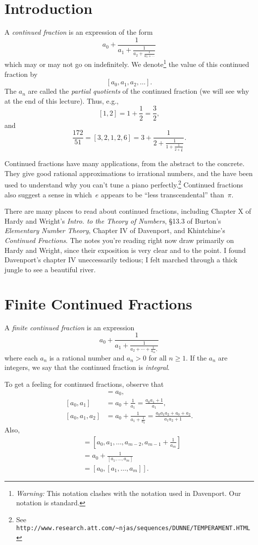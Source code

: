 \documentclass[11pt]{report}
\begin{document}
\section{Introduction}
A {\em continued fraction} is an expression of the form
$$a_0 + \frac{1}{a_1+\frac{1}{a_2+\frac{1}{a_3+\cdots}}}$$
which may or may not go on indefinitely.  We denote\footnote{{\em Warning:}
  This notation clashes with the notation
  used in Davenport.  Our notation is standard.}
the value of this continued fraction by
$$[a_0,a_1,a_2,\ldots].$$
The $a_n$ are called the {\em partial quotients}
of the continued fraction (we will see why at the end of this lecture).
Thus, e.g.,
$$[1,2] = 1+\frac{1}{2} = \frac{3}{2},$$
and
$$\frac{172}{51} = [3,2,1,2,6]=3+\frac{1}{2+\frac{1}{1+\frac{1}{2+\frac{1}{6}}}}.$$

Continued fractions have many applications, from the abstract to the concrete.
They give good rational approximations to irrational numbers, and
the have been used to understand why you can't tune a
piano perfectly.\footnote{See
{\tt http://www.research.att.com/\~{\mbox{}}njas/sequences/DUNNE/TEMPERAMENT.HTML}}
Continued fractions also suggest a sense in which~$e$ appears to
be ``less transcendental'' than~$\pi$.

There are many places to read about continued fractions, including
Chapter X of Hardy and Wright's {\em Intro. to the Theory of Numbers},
\S13.3 of Burton's {\em Elementary Number Theory}, Chapter IV of
Davenport, and Khintchine's {\em Continued Fractions}. The notes
you're reading right now draw primarily on Hardy and Wright, since
their exposition is very clear and to the point.  I found Davenport's
chapter IV uneccessarily tedious; I felt marched through a thick
jungle to see a beautiful river.

\section{Finite Continued Fractions}
\begin{definition}
  A {\em finite continued fraction} is an expression
  $$
    a_0 + \frac{1}{a_1+\frac{1}{a_2 + \cdots + \frac{1}{a_m},}}$$
  where each $a_n$ is a rational number and $a_n>0$ for all $n\geq 1$.
  If the $a_n$ are integers, we say that the continued fraction is
    {\em integral}.
\end{definition}
To get a feeling for continued fractions, observe that
\begin{align*}
  [a_0]           & = a_0,                                           \\
  [a_0, a_1]      & = a_0 + \frac{1}{a_1} = \frac{a_0 a_1 + 1}{a_1}, \\
  [a_0, a_1, a_2] & = a_0 + \frac{1}{a_1 + \frac{1}{a_2}}
  = \frac{a_0 a_1 a_2 + a_0 + a_2}{a_1 a_2 + 1}.
\end{align*}
Also,
\begin{align*}
  [a_0, a_1, \ldots ,a_{m-1}, a_m] & =
  [a_0, a_1, \ldots, a_{m-2}, a_{m-1} + \frac{1}{a_m}]                   \\
                                   & = a_0 + \frac{1}{[a_1,\ldots, a_m]} \\
                                   & = [a_0, [a_1,\ldots, a_m]].
\end{align*}
\end{document}
